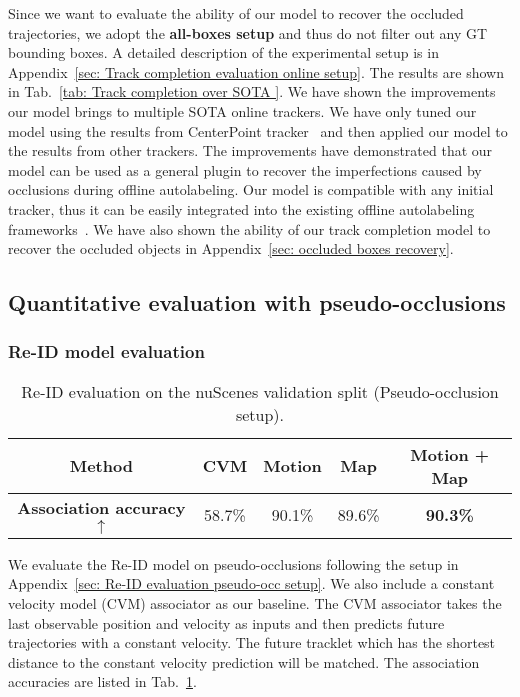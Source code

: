 \documentclass{article} \usepackage{iclr2023_conference,times}
\begin{document}
Since we want to evaluate the ability of our model to recover the occluded trajectories, we adopt the \textbf{all-boxes setup} and thus do not filter out any GT bounding boxes. A detailed description of the experimental setup is in Appendix~\ref{sec: Track completion evaluation online setup}. The results are shown in Tab.~\ref{tab: Track completion over SOTA }. We have shown the improvements our model brings to multiple SOTA online trackers. We have only tuned our model using the results from CenterPoint tracker~\cite{Centerpoint} and then applied our model to the results from other trackers. The improvements have demonstrated that our model can be used as a general plugin to recover the imperfections caused by occlusions during offline autolabeling. Our model is compatible with any initial tracker, thus it can be easily integrated into the existing offline autolabeling frameworks~\cite{offboard_labeling,Auto4d}. We have also shown the ability of our track completion model to recover the occluded objects in Appendix~\ref{sec: occluded boxes recovery}. 


\vspace{-1mm}
\subsection{Quantitative evaluation with pseudo-occlusions}
\label{sec: pseudo-occlusion eval}
\vspace{-1mm}
\subsubsection{Re-ID model evaluation}
\vspace{-1mm}

\begin{table}
    \centering
    \begin{tabular}{c|c c c c }
     \textbf{Method}  & CVM & Motion & Map & Motion + Map \\
    \hline \textbf{Association accuracy $\uparrow$} & 58.7\% & 90.1\% & 89.6\% & \textbf{90.3\%} \\
    \end{tabular}
    \caption{Re-ID evaluation on the nuScenes validation split (Pseudo-occlusion setup). 
    }
    \label{tab: pseudo occlusion Re-ID}
\end{table}
We evaluate the Re-ID model on pseudo-occlusions following the setup in Appendix~\ref{sec: Re-ID evaluation pseudo-occ setup}.  We also include a constant velocity model (CVM) associator as our baseline. The CVM associator takes the last observable position and velocity as inputs and then predicts future trajectories with a constant velocity. The future tracklet which has the shortest distance to the constant velocity prediction will be matched. The association accuracies are listed in Tab.~\ref{tab: pseudo occlusion Re-ID}. 
\end{document}
